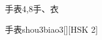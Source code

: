 \begin{entry}{手表}{4,8}{⼿、⾐}
  \begin{phonetics}{手表}{shou3biao3}[][HSK 2]
  \end{phonetics}
\end{entry}
